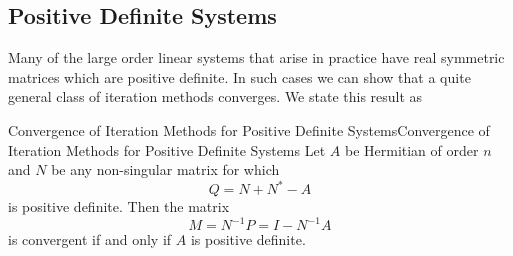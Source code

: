\documentclass[../main.tex]{subfiles}
\begin{document}
\subsection{Positive Definite Systems}
Many of the large order linear systems that arise in practice have real symmetric matrices which are positive definite. In such cases we can show that a quite general class of iteration methods converges. We state this result as
\begin{theorem}{Convergence of Iteration Methods for Positive Definite Systems}{Convergence of Iteration Methods for Positive Definite Systems}
	Let $A$ be Hermitian of order $n$ and $N$ be any non-singular matrix for which
	\begin{equation}
		Q = N + N^* - A
	\end{equation}
	is positive definite. Then the matrix
	\begin{equation*}
		M = N^{-1} P = I - N^{-1} A
	\end{equation*}
	is convergent if and only if $A$ is positive definite.
\end{theorem}
\end{document}
